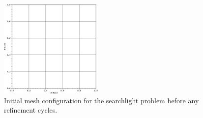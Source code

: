 \begin{figure}
\centering
\includegraphics[width=0.45\textwidth]{figures/sec_BF/searchlight_starting_mesh.eps}
\caption{Initial mesh configuration for the searchlight problem before any refinement cycles.}
\label{fig::BF_Results_SL_starting_mesh}
\end{figure}

